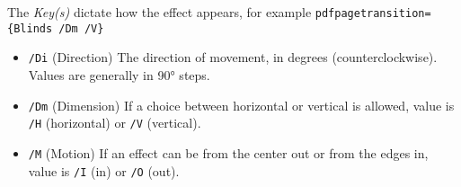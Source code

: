  
 
 

The \emph{Key(s)} dictate how the effect appears, for example \verb|pdfpagetransition={Blinds /Dm /V}| 

\begin{itemize}
  \item \verb|/Di| (Direction) The direction of movement, in degrees (counterclockwise). Values are generally in 90° steps. 
  \item \verb|/Dm| (Dimension) If a choice between horizontal or vertical is allowed, value is \verb|/H| (horizontal) or \verb|/V| (vertical). 
  \item \verb|/M| (Motion) If an effect can be from the center out or from the edges in, value is \verb|/I| (in) or \verb|/O| (out). 
\end{itemize}
